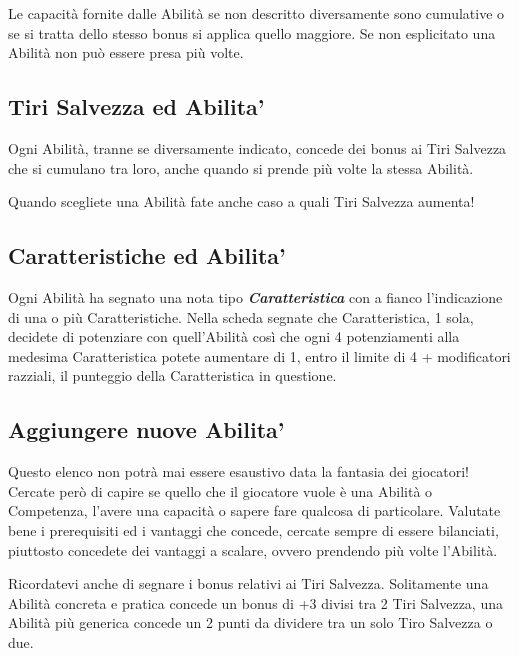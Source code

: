 \begin{multicols}{2}
Le capacità fornite dalle Abilità se non descritto diversamente sono cumulative o se si tratta dello stesso bonus si applica quello maggiore. Se non esplicitato una Abilità non può essere presa più volte.

\subsection{Tiri Salvezza ed Abilita'}\label{tirisalvezzaedabilita}

Ogni Abilità, tranne se diversamente indicato, concede dei bonus ai Tiri Salvezza che si cumulano tra loro, anche quando si prende più volte la stessa Abilità.

Quando scegliete una Abilità fate anche caso a quali Tiri Salvezza aumenta!

\subsection{Caratteristiche ed Abilita'}\label{caratteristicheedabilita}

Ogni Abilità ha segnato una nota tipo \emph{\textbf{Caratteristica}} con a fianco l'indicazione di una o più Caratteristiche. Nella scheda segnate che Caratteristica, 1 sola, decidete di potenziare con quell'Abilità così che ogni 4 potenziamenti alla medesima Caratteristica potete aumentare di 1, entro il limite di 4 + modificatori razziali, il punteggio della Caratteristica in questione.

\subsection{Aggiungere nuove Abilita'}\label{aggiungereabilita}

Questo elenco non potrà mai essere esaustivo data la fantasia dei giocatori! Cercate però di capire se quello che il giocatore vuole è una Abilità o Competenza, l'avere una capacità o sapere fare qualcosa di particolare.
Valutate bene i prerequisiti ed i vantaggi che concede, cercate sempre di essere bilanciati, piuttosto concedete dei vantaggi a scalare, ovvero prendendo più volte l'Abilità.

Ricordatevi anche di segnare i bonus relativi ai Tiri Salvezza. Solitamente una Abilità concreta e pratica concede un bonus di +3 divisi tra 2 Tiri Salvezza, una Abilità più generica concede un 2 punti da dividere tra un solo Tiro Salvezza o due.




\end{multicols}
